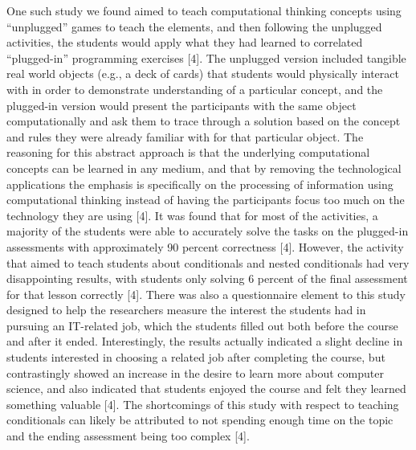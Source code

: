 One such study we found aimed to teach computational thinking concepts using 
“unplugged” games to teach the elements, and then following the unplugged activities, 
the students would apply what they had learned to correlated “plugged-in” programming 
exercises [4]. The unplugged version included tangible real world objects (e.g., a deck 
of cards) that students would physically interact with in order to demonstrate understanding 
of a particular concept, and the plugged-in version would present the participants with 
the same object computationally and ask them to trace through a solution based on the 
concept and rules they were already familiar with for that particular object. The reasoning 
for this abstract approach is that the underlying computational concepts can be learned 
in any medium, and that by removing the technological applications the emphasis is 
specifically on the processing of information using computational thinking instead of 
having the participants focus too much on the technology they are using [4]. It was 
found that for most of the activities, a majority of the students were able to accurately 
solve the tasks on the plugged-in assessments with approximately 90 percent 
correctness [4]. However, the activity that aimed to teach students about conditionals 
and nested conditionals had very disappointing results, with students only solving 6 
percent of the final assessment for that lesson correctly [4]. There was also a 
questionnaire element to this study designed to help the researchers measure the 
interest the students had in pursuing an IT-related job, which the students filled out 
both before the course and after it ended. Interestingly, the results actually indicated 
a slight decline in students interested in choosing a related job after completing the 
course, but contrastingly showed an increase in the desire to learn more about 
computer science, and also indicated that students enjoyed the course and felt they 
learned something valuable [4]. The shortcomings of this study with respect to 
teaching conditionals can likely be attributed to not spending enough time on the 
topic and the ending assessment being too complex [4].\\

